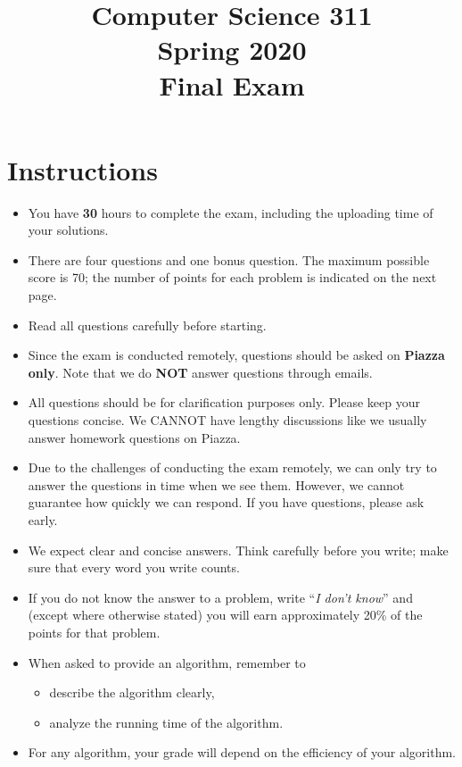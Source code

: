 \documentclass[12pt]{amsart}
\begin{document}


\title{
Computer Science 311\\
Spring 2020\\
Final Exam \\
}

\maketitle



\section*{Instructions}

\begin{itemize}
\item
You have {\bf 30} hours to complete the exam, including the uploading time of your solutions. 
\item 
There are four questions and one bonus question. The maximum possible score is 70; the number of points for each problem is indicated on the next page.
\item
Read all questions carefully before starting.
\item
Since the exam is conducted remotely, questions should be asked on {\bf Piazza only}. Note that we do {\bf NOT} answer questions through emails. 
\item All questions should be for clarification purposes only. Please keep your questions concise. We CANNOT have lengthy discussions like we usually answer homework questions on Piazza.
\item Due to the challenges of conducting the exam remotely, we can only try to answer the questions in time when we see them. However, we cannot guarantee how quickly we can respond. If you have questions, please ask early.
\item
We expect clear and concise answers.  Think carefully before you write; make sure that every word you write counts. 
\item
If you do not know the answer to a problem, write ``\emph{I don't know}'' and (except where otherwise stated) you will earn approximately 20\% of the points for that problem.
\item
When asked to provide an algorithm, remember to
\begin{itemize}
\item
describe the algorithm clearly,
\item
analyze the running time of the algorithm.
\end{itemize}
\item For any algorithm, your grade will depend on the efficiency of your algorithm.
\end{itemize}
\end{document}

